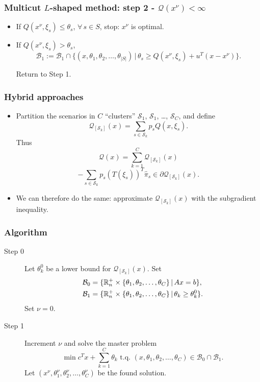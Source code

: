 \documentclass{beamer}
\begin{document}
\begin{frame}
\frametitle{Multicut $L$-shaped method: step 2 - $\mathcal{Q}(x^{\nu}) < \infty$}
	
\begin{itemize}
\item
If $Q(x^{\nu}, \xi_s) \leq \theta_s$, $\forall\, s \in S$, stop: $x^{\nu}$ is optimal.
\item
If $Q(x^{\nu}, \xi_s) > \theta_s$,
\[
\mathcal{B}_1 := \mathcal{B}_1 \cap \lbrace (x,\theta_1,\theta_2,\ldots,\theta_{|S|}) \,|\,
\theta_s \geq Q(x^{\nu}, \xi_s) + u^T(x-x^{\nu})\rbrace.
\]
		
Return to Step 1.
\end{itemize}
	
\end{frame}

\begin{frame}
\frametitle{Hybrid approaches}

\begin{itemize}
	\item
	Partition the scenarios in $C$ ``clusters'' $\mathcal{S}_1$,
	$\mathcal{S}_1$, \ldots, $\mathcal{S}_C$, and define
	\[
	\mathcal{Q}_{[\mathcal{S}_k]}(x) = \sum_{s \in \mathcal{S}_k} p_s Q(x, \xi_s).
	\]
	Thus
	\[
	\mathcal{Q}(x) = \sum_{k = 1}^C \mathcal{Q}_{[\mathcal{S}_k]}(x)
	\]
	\[
	-\sum_{s \in \mathcal{S}_k} p_s(T(\xi_s))^T\hat{\pi}_s
	\in \partial \mathcal{Q}_{[\mathcal{S}_k]}(x).
	\]
	\item
	We can therefore do the same: approximate $\mathcal{Q}_{[\mathcal{S}_k]}(x)$ with the subgradient inequality.
\end{itemize}

\end{frame}

\begin{frame}
\frametitle{Algorithm}

\begin{description}
\item[Step 0]
Let $\theta_k^0$ be a lower bound for $\mathcal{Q}_{[\mathcal{S}_k]}(x)$.
Set
\begin{align*}
\mathcal{B}_0 &= \lbrace \mathbb{R}_n^+ \times \lbrace \theta_1,
\theta_2,\ldots, \theta_C \rbrace \,|\, Ax = b \rbrace, \\
\mathcal{B}_1 &= \lbrace \mathbb{R}_n^+ \times \lbrace \theta_1,
\theta_2,\ldots, \theta_C \rbrace \,|\, \theta_k \geq \theta_k^0 \rbrace.
\end{align*}
Set $\nu = 0$.
\item[Step 1]
Increment $\nu$ and solve the {\blue master problem}
\[
\min c^Tx + \sum_{k = 1}^C \theta_k \mbox{ t.q. } (x, \theta_1,
\theta_2,\ldots,  \theta_C) \in \mathcal{B}_0 \cap \mathcal{B}_1.
\]
Let $(x^{\nu}, \theta_1^{\nu}, \theta_2^{\nu},\ldots,
\theta_C^{\nu})$ be the found solution.
\end{description}

\end{frame}
\end{document}
